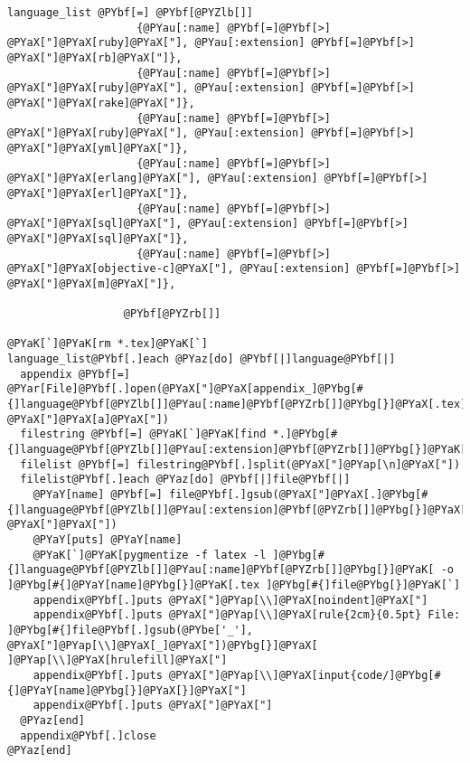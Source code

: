 \begin{Verbatim}[commandchars=@\[\]]
language_list @PYbf[=] @PYbf[@PYZlb[]]
                    {@PYau[:name] @PYbf[=]@PYbf[>] @PYaX["]@PYaX[ruby]@PYaX["], @PYau[:extension] @PYbf[=]@PYbf[>] @PYaX["]@PYaX[rb]@PYaX["]},
                    {@PYau[:name] @PYbf[=]@PYbf[>] @PYaX["]@PYaX[ruby]@PYaX["], @PYau[:extension] @PYbf[=]@PYbf[>] @PYaX["]@PYaX[rake]@PYaX["]},
                    {@PYau[:name] @PYbf[=]@PYbf[>] @PYaX["]@PYaX[ruby]@PYaX["], @PYau[:extension] @PYbf[=]@PYbf[>] @PYaX["]@PYaX[yml]@PYaX["]},
                    {@PYau[:name] @PYbf[=]@PYbf[>] @PYaX["]@PYaX[erlang]@PYaX["], @PYau[:extension] @PYbf[=]@PYbf[>] @PYaX["]@PYaX[erl]@PYaX["]},
                    {@PYau[:name] @PYbf[=]@PYbf[>] @PYaX["]@PYaX[sql]@PYaX["], @PYau[:extension] @PYbf[=]@PYbf[>] @PYaX["]@PYaX[sql]@PYaX["]},
                    {@PYau[:name] @PYbf[=]@PYbf[>] @PYaX["]@PYaX[objective-c]@PYaX["], @PYau[:extension] @PYbf[=]@PYbf[>] @PYaX["]@PYaX[m]@PYaX["]},
                    
                  @PYbf[@PYZrb[]]

@PYaK[`]@PYaK[rm *.tex]@PYaK[`]
language_list@PYbf[.]each @PYaz[do] @PYbf[|]language@PYbf[|]
  appendix @PYbf[=] @PYar[File]@PYbf[.]open(@PYaX["]@PYaX[appendix_]@PYbg[#{]language@PYbf[@PYZlb[]]@PYau[:name]@PYbf[@PYZrb[]]@PYbg[}]@PYaX[.tex]@PYaX["], @PYaX["]@PYaX[a]@PYaX["])
  filestring @PYbf[=] @PYaK[`]@PYaK[find *.]@PYbg[#{]language@PYbf[@PYZlb[]]@PYau[:extension]@PYbf[@PYZrb[]]@PYbg[}]@PYaK[`]
  filelist @PYbf[=] filestring@PYbf[.]split(@PYaX["]@PYap[\n]@PYaX["])
  filelist@PYbf[.]each @PYaz[do] @PYbf[|]file@PYbf[|]
    @PYaY[name] @PYbf[=] file@PYbf[.]gsub(@PYaX["]@PYaX[.]@PYbg[#{]language@PYbf[@PYZlb[]]@PYau[:extension]@PYbf[@PYZrb[]]@PYbg[}]@PYaX["], @PYaX["]@PYaX["])
    @PYaY[puts] @PYaY[name]
    @PYaK[`]@PYaK[pygmentize -f latex -l ]@PYbg[#{]language@PYbf[@PYZlb[]]@PYau[:name]@PYbf[@PYZrb[]]@PYbg[}]@PYaK[ -o ]@PYbg[#{]@PYaY[name]@PYbg[}]@PYaK[.tex ]@PYbg[#{]file@PYbg[}]@PYaK[`]
    appendix@PYbf[.]puts @PYaX["]@PYap[\\]@PYaX[noindent]@PYaX["]
    appendix@PYbf[.]puts @PYaX["]@PYap[\\]@PYaX[rule{2cm}{0.5pt} File: ]@PYbg[#{]file@PYbf[.]gsub(@PYbe['_'], @PYaX["]@PYap[\\]@PYaX[_]@PYaX["])@PYbg[}]@PYaX[ ]@PYap[\\]@PYaX[hrulefill]@PYaX["]
    appendix@PYbf[.]puts @PYaX["]@PYap[\\]@PYaX[input{code/]@PYbg[#{]@PYaY[name]@PYbg[}]@PYaX[}]@PYaX["]
    appendix@PYbf[.]puts @PYaX["]@PYaX["]
  @PYaz[end]
  appendix@PYbf[.]close
@PYaz[end]
\end{Verbatim}
